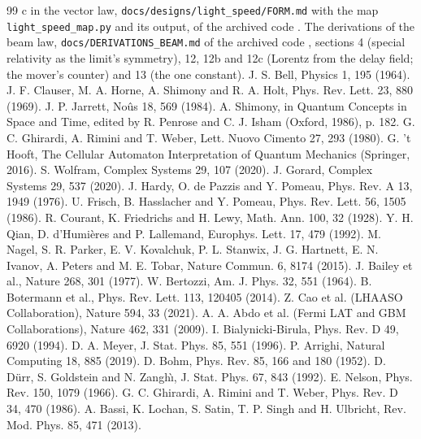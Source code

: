 \documentclass[11pt]{article}
\theoremstyle{definition}
\begin{document}
\begin{thebibliography}{99}
 c in the vector law, \texttt{docs/designs/light\_speed/FORM.md} with the map \texttt{light\_speed\_map.py} and its output, of the archived code \cite{zenodo}.
 The derivations of the beam law, \texttt{docs/DERIVATIONS\_BEAM.md} of the archived code \cite{zenodo}, sections 4 (special relativity as the limit's symmetry), 12, 12b and 12c (Lorentz from the delay field; the mover's counter) and 13 (the one constant).
 J. S. Bell, Physics 1, 195 (1964).
 J. F. Clauser, M. A. Horne, A. Shimony and R. A. Holt, Phys. Rev. Lett. 23, 880 (1969).
 J. P. Jarrett, No\^us 18, 569 (1984).
 A. Shimony, in Quantum Concepts in Space and Time, edited by R. Penrose and C. J. Isham (Oxford, 1986), p. 182.
 G. C. Ghirardi, A. Rimini and T. Weber, Lett. Nuovo Cimento 27, 293 (1980).
 G. 't Hooft, The Cellular Automaton Interpretation of Quantum Mechanics (Springer, 2016).
 S. Wolfram, Complex Systems 29, 107 (2020).
 J. Gorard, Complex Systems 29, 537 (2020).
 J. Hardy, O. de Pazzis and Y. Pomeau, Phys. Rev. A 13, 1949 (1976).
 U. Frisch, B. Hasslacher and Y. Pomeau, Phys. Rev. Lett. 56, 1505 (1986).
 R. Courant, K. Friedrichs and H. Lewy, Math. Ann. 100, 32 (1928).
 Y. H. Qian, D. d'Humi\`eres and P. Lallemand, Europhys. Lett. 17, 479 (1992).
 M. Nagel, S. R. Parker, E. V. Kovalchuk, P. L. Stanwix, J. G. Hartnett, E. N. Ivanov, A. Peters and M. E. Tobar, Nature Commun. 6, 8174 (2015).
 J. Bailey et al., Nature 268, 301 (1977).
 W. Bertozzi, Am. J. Phys. 32, 551 (1964).
 B. Botermann et al., Phys. Rev. Lett. 113, 120405 (2014).
 Z. Cao et al. (LHAASO Collaboration), Nature 594, 33 (2021).
 A. A. Abdo et al. (Fermi LAT and GBM Collaborations), Nature 462, 331 (2009).
 I. Bialynicki-Birula, Phys. Rev. D 49, 6920 (1994).
 D. A. Meyer, J. Stat. Phys. 85, 551 (1996).
 P. Arrighi, Natural Computing 18, 885 (2019).
 D. Bohm, Phys. Rev. 85, 166 and 180 (1952).
 D. D\"urr, S. Goldstein and N. Zangh\`{\i}, J. Stat. Phys. 67, 843 (1992).
 E. Nelson, Phys. Rev. 150, 1079 (1966).
 G. C. Ghirardi, A. Rimini and T. Weber, Phys. Rev. D 34, 470 (1986).
 A. Bassi, K. Lochan, S. Satin, T. P. Singh and H. Ulbricht, Rev. Mod. Phys. 85, 471 (2013).

\end{thebibliography}
\end{document}
